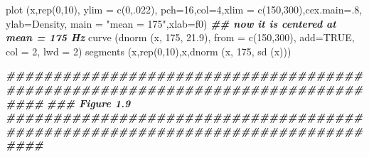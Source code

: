 \documentclass[
]{book}
\newenvironment{Shaded}{\begin{snugshade}}{\end{snugshade}}
\newcommand{\AttributeTok}[1]{\textcolor[rgb]{0.77,0.63,0.00}{#1}}
\newcommand{\ConstantTok}[1]{\textcolor[rgb]{0.00,0.00,0.00}{#1}}
\newcommand{\DecValTok}[1]{\textcolor[rgb]{0.00,0.00,0.81}{#1}}
\newcommand{\DocumentationTok}[1]{\textcolor[rgb]{0.56,0.35,0.01}{\textbf{\textit{#1}}}}
\newcommand{\FloatTok}[1]{\textcolor[rgb]{0.00,0.00,0.81}{#1}}
\newcommand{\FunctionTok}[1]{\textcolor[rgb]{0.00,0.00,0.00}{#1}}
\newcommand{\NormalTok}[1]{#1}
\newcommand{\StringTok}[1]{\textcolor[rgb]{0.31,0.60,0.02}{#1}}
\begin{document}
\begin{Shaded}
\begin{Highlighting}[]
\FunctionTok{plot}\NormalTok{ (x,}\FunctionTok{rep}\NormalTok{(}\DecValTok{0}\NormalTok{,}\DecValTok{10}\NormalTok{), }\AttributeTok{ylim =} \FunctionTok{c}\NormalTok{(}\DecValTok{0}\NormalTok{,.}\DecValTok{022}\NormalTok{), }\AttributeTok{pch=}\DecValTok{16}\NormalTok{,}\AttributeTok{col=}\DecValTok{4}\NormalTok{,}\AttributeTok{xlim =} \FunctionTok{c}\NormalTok{(}\DecValTok{150}\NormalTok{,}\DecValTok{300}\NormalTok{),}\AttributeTok{cex.main=}\NormalTok{.}\DecValTok{8}\NormalTok{, }
      \AttributeTok{ylab=}\StringTok{\textquotesingle{}Density\textquotesingle{}}\NormalTok{, }\AttributeTok{main =} \StringTok{"mean = 175"}\NormalTok{,}\AttributeTok{xlab=}\StringTok{\textquotesingle{}f0\textquotesingle{}}\NormalTok{)}
\DocumentationTok{\#\# now it is centered at mean = 175 Hz}
\FunctionTok{curve}\NormalTok{ (}\FunctionTok{dnorm}\NormalTok{ (x, }\DecValTok{175}\NormalTok{, }\FloatTok{21.9}\NormalTok{), }\AttributeTok{from =} \FunctionTok{c}\NormalTok{(}\DecValTok{150}\NormalTok{,}\DecValTok{300}\NormalTok{), }
       \AttributeTok{add=}\ConstantTok{TRUE}\NormalTok{, }\AttributeTok{col =} \DecValTok{2}\NormalTok{, }\AttributeTok{lwd =} \DecValTok{2}\NormalTok{)}
\FunctionTok{segments}\NormalTok{ (x,}\FunctionTok{rep}\NormalTok{(}\DecValTok{0}\NormalTok{,}\DecValTok{10}\NormalTok{),x,}\FunctionTok{dnorm}\NormalTok{ (x, }\DecValTok{175}\NormalTok{, }\FunctionTok{sd}\NormalTok{ (x)))}


\DocumentationTok{\#\#\#\#\#\#\#\#\#\#\#\#\#\#\#\#\#\#\#\#\#\#\#\#\#\#\#\#\#\#\#\#\#\#\#\#\#\#\#\#\#\#\#\#\#\#\#\#\#\#\#\#\#\#\#\#\#\#\#\#\#\#\#\#\#\#\#\#\#\#\#\#\#\#\#\#\#\#\#\#}
\DocumentationTok{\#\#\# Figure 1.9}
\DocumentationTok{\#\#\#\#\#\#\#\#\#\#\#\#\#\#\#\#\#\#\#\#\#\#\#\#\#\#\#\#\#\#\#\#\#\#\#\#\#\#\#\#\#\#\#\#\#\#\#\#\#\#\#\#\#\#\#\#\#\#\#\#\#\#\#\#\#\#\#\#\#\#\#\#\#\#\#\#\#\#\#\#}


\end{Highlighting}
\end{Shaded}
\end{document}
